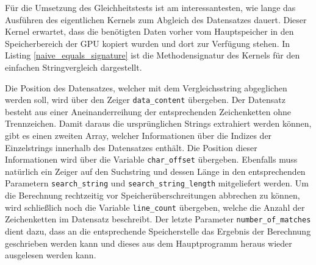 Für die Umsetzung des Gleichheitstests ist am interessantesten, wie lange das Ausführen des eigentlichen Kernels zum Abgleich des Datensatzes dauert.
Dieser Kernel erwartet, dass die benötigten Daten vorher vom Hauptspeicher in den Speicherbereich der GPU kopiert wurden und dort zur Verfügung stehen.
In Listing \ref{naive_equals_signature} ist die Methodensignatur des Kernels für den einfachen Stringvergleich dargestellt.

Die Position des Datensatzes, welcher mit dem Vergleichsstring abgeglichen werden soll, wird über den Zeiger \texttt{data\_content} übergeben.
Der Datensatz besteht aus einer Aneinanderreihung der entsprechenden Zeichenketten ohne Trennzeichen.
Damit daraus die ursprünglichen Strings extrahiert werden können, gibt es einen zweiten Array, welcher Informationen über die Indizes der Einzelstrings innerhalb des Datensatzes enthält.
Die Position dieser Informationen wird über die Variable \texttt{char\_offset} übergeben.
Ebenfalls muss natürlich ein Zeiger auf den Suchstring und dessen Länge in den entsprechenden Parametern \texttt{search\_string} und \texttt{search\_string\_length} mitgeliefert werden.
Um die Berechnung rechtzeitig vor Speicherüberschreitungen abbrechen zu können, wird schließlich noch die Variable \texttt{line\_count} übergeben, welche die Anzahl der Zeichenketten im Datensatz beschreibt.
Der letzte Parameter \texttt{number\_of\_matches} dient dazu, dass an die entsprechende Speicherstelle das Ergebnis der Berechnung geschrieben werden kann und dieses aus dem Hauptprogramm heraus wieder ausgelesen werden kann.

\newpage

